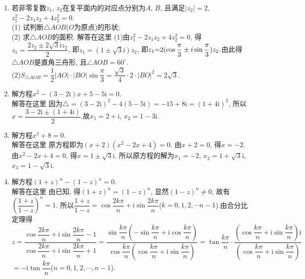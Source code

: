 \documentclass[10pt,a4paper]{article}
\begin{document}
\begin{enumerate}[1.]
\begin{center}
\end{center}
\item 若非零复数$z_1$, $z_2$在复平面内的对应点分别为$A$, $B$, 且满足$|z_2|=2$, $z_1^2-2z_1z_2+4z_2^2=0$.\\
(1) 试判断$\triangle AOB$($O$为原点)的形状;\\	
(2) 求$\triangle AOB$的面积.
解答在这里  (1)由$z_1^2-2z_1z_2+4z_2^2=0$, 得$z_1=\dfrac{2z_2\pm 2\sqrt 3\mathrm{i}z_2}2$, 即$z_1=(1\pm \sqrt 3\mathrm{i})z_2$,
即$z_1\text=2(\cos \dfrac{\pi }3\pm i\sin \dfrac{\pi }3)z_2$.由此得$\triangle AOB$是直角三舟形, 且$\angle AOB=60^\circ$.\\
(2)$S_{\triangle AOB}=\dfrac 12|AO|\cdot|BO|\sin \dfrac{\pi }3=\dfrac{\sqrt 3}4\cdot 2\cdot|BO|^2=2\sqrt 3$.
\item 解方程$x^2-(3-2\mathrm{i})x+5-5\mathrm{i}=0$.\\
解答在这里  因为$\triangle =(3-2\mathrm{i})^2-4(5-5\mathrm{i})=-15+8\mathrm{i}=(1+4\mathrm{i})^2$,
所以$x=\dfrac{3-2\mathrm{i}\pm (1+4\mathrm{i})}2$.故$x_1=2+\mathrm{i}$, $x_2=1-3\mathrm{i}$.
\item 解方程$x^3+8=0$.\\
解答在这里 原方程即为$(x+2)(x^2-2x+4)=0$.
由$x+2=0$, 得$x=-2$.由$x^2-2x+4=0$, 得$x=1\pm \sqrt 3\mathrm{i}$.
所以原方程的解为$x_1=-2$, $x_2=1+\sqrt 3\mathrm{i}$, $x_3=1-\sqrt 3\mathrm{i}$.
\item 解方程$(1+z)^n-(1-z)^n=0$.\\
解答在这里  由已知, 得$(1+z)^n=(1-z)^n$, 显然$(1-z)^n\ne 0$, 故有$(\dfrac{1+z}{1-z})^n=1$.
所以$\dfrac{1+z}{1-z}=\cos \dfrac{2k\pi }n+\mathrm{i}\sin \dfrac{2k\pi }n$($k=0,1,2,\cdots n-1$).由合分比定理得
$z=\dfrac{\cos \dfrac{2k\pi }n+\mathrm{i}\sin \dfrac{2k\pi }n-1}{\cos \dfrac{2k\pi }n+\mathrm{i}\sin \dfrac{2k\pi }n+1}=\dfrac{\sin \dfrac{k\pi }n(-\sin \dfrac{k\pi }n+\mathrm{i}\cos \dfrac{k\pi }n)}{\cos \dfrac{k\pi }n(\cos \dfrac{k\pi }n+\mathrm{i}\sin \dfrac{k\pi }n)}=\tan \dfrac{k\pi }n\cdot \dfrac{(\cos \dfrac{k\pi }n+\mathrm{i}\sin \dfrac{k\pi }n)\mathrm{i}}{(\cos \dfrac{k\pi }n+\mathrm{i}\sin \dfrac{k\pi }n)}$
    $=-\mathrm{i}\tan \dfrac{k\pi }n$($n=0,1,2,\cdots ,n-1$).

\end{enumerate}
\end{document}
